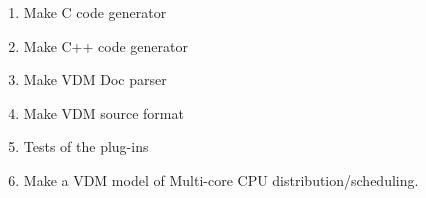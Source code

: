 \documentclass{overturerep}
\begin{document}
\begin{description}
\begin{enumerate}
\item Make C code generator

\item Make C++ code generator

\item Make VDM Doc parser



\item Make VDM source format
  
  \item Tests of the plug-ins
\item Make a VDM model of Multi-core CPU distribution/scheduling.

\end{enumerate}
\end{description}










\appendix*



%
%
\end{document}
